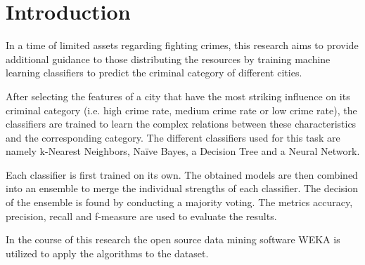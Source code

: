 \section{Introduction}

In a time of limited assets regarding fighting crimes,
this research aims to provide additional guidance to
those distributing the resources by training machine learning
classifiers to predict the criminal category of different cities.

After selecting the features of a city that have the most striking
influence on its criminal category (i.e. high crime rate, medium crime
rate or low crime rate), the classifiers are trained to learn the
complex relations between these characteristics and the corresponding
category. The different classifiers used for this task are
namely k-Nearest Neighbors, Na\"ive Bayes, a Decision Tree and a
Neural Network.

Each classifier is first trained on its own. The obtained models are
then combined into an ensemble to merge the individual
strengths of each classifier. The decision of the ensemble is found by
conducting a majority voting.
The metrics accuracy, precision, recall and f-measure are
used to evaluate the results.

In the course of this research the open source data mining software
WEKA is utilized to apply the algorithms to the dataset.

